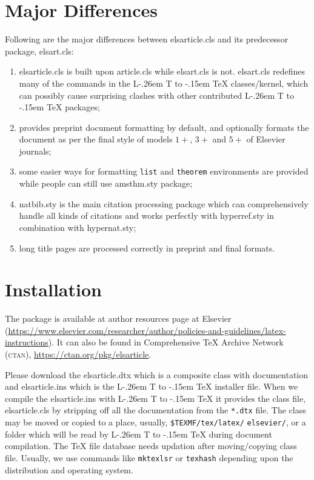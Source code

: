 \documentclass[a4paper,12pt]{article}
\makeatletter
\def\file#1{\textsf{#1}\xspace}
\DeclareRobustCommand{\LaTeX}{L\kern-.26em%
        {\sbox\z@ T%
         \vbox to\ht\z@{\hbox{\check@mathfonts
           \fontsize\sf@size\z@
           \math@fontsfalse\selectfont
          A\,}%
         \vss}%
        }%
     \kern-.15em%
    \TeX}
\makeatother
\begin{document}
\section{Major Differences}

Following are the major differences between \file{elsarticle.cls}
and its predecessor package, \file{elsart.cls}:

\begin{enumerate}[\textbullet]
\item \file{elsarticle.cls} is built upon \file{article.cls}
while \file{elsart.cls} is not. \file{elsart.cls} redefines
many of the commands in the \LaTeX{} classes/kernel, which can
possibly cause surprising clashes with other contributed
\LaTeX{} packages;

\item provides preprint document formatting by default, and
optionally formats the document as per the final
style of models $1+$, $3+$ and $5+$ of Elsevier journals;

\item some easier ways for formatting \verb+list+ and
\verb+theorem+ environments are provided while people can still
use \file{amsthm.sty} package;

\item \file{natbib.sty} is the main citation processing package
  which can comprehensively handle all kinds of citations and
works perfectly with \file{hyperref.sty} in combination with
\file{hypernat.sty};

\item long title pages are processed correctly in preprint and
  final formats.

\end{enumerate}

\section{Installation}

The package is available at author resources page at Elsevier
(\url{https://www.elsevier.com/researcher/author/policies-and-guidelines/latex-instructions}).
It can also be found in Comprehensive
\TeX{} Archive Network (\textsc{ctan}), 
\url{https://ctan.org/pkg/elsarticle}.

Please download the \file{elsarticle.dtx} which is a composite
class with documentation and \file{elsarticle.ins} which is the
\LaTeX{} installer file. When we compile the
\file{elsarticle.ins} with \LaTeX{} it provides the class file,
\file{elsarticle.cls} by
stripping off all the documentation from the \verb+*.dtx+ file.
The class may be moved or copied to a place, usually,
\verb+$TEXMF/tex/latex/+ %
\verb+elsevier/+, 
or a folder which will be read                   
by \LaTeX{} during document compilation.  The \TeX{} file
database needs updation after moving/copying class file.  Usually,
we use commands like \verb+mktexlsr+ or \verb+texhash+ depending
upon the distribution and operating system.
\end{document}

